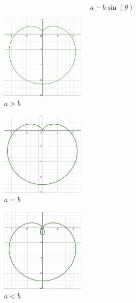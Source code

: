     \newpage
    
    \begin{equation}
        a-b\sin{(\theta)}
    \end{equation}
    
    \begin{multicols}{3}
    \begin{figure}[H]
        \centering
        \includegraphics[width=4cm]{Pictures/Polar Form/SinBigger.png}
        \caption[]{$a>b$ \footnotemark[2]}
        \label{a>b}
    \end{figure}
    \begin{figure}[H]
        \centering
        \includegraphics[width=4cm]{Pictures/Polar Form/SinEqual.png}
        \caption[]{$a=b$ \footnotemark[2]}
        \label{a=b}
    \end{figure}
    \begin{figure}[H]
        \centering
        \includegraphics[width=4cm]{Pictures/Polar Form/SinSmaller.png}
        \caption[]{$a<b$ \footnotemark[2]}
        \label{a<b}
    \end{figure}
    \end{multicols}
    
